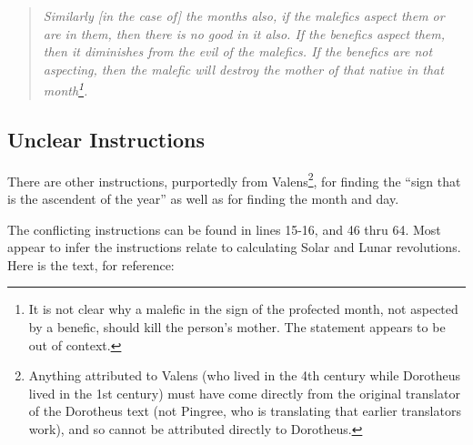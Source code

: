 \begin{quote}
\textsl{Similarly [in the case of] the months also, if the malefics aspect them or are in them, then there is no good in it also. If the benefics aspect them, then it diminishes from the evil of the malefics. If the benefics are not aspecting, then the malefic will destroy the mother of that native in that month\footnote{It is not clear why a malefic in the sign of the profected month, not aspected by a benefic, should kill the person's mother. The statement appears to be out of context.}.}
\end{quote}

\subsection{Unclear Instructions}
There are other instructions, purportedly from Valens\footnote{Anything attributed to Valens (who lived in the 4th century while Dorotheus lived in the 1st century) must have come directly from the original translator of the Dorotheus text (not Pingree, who is translating that earlier translators work), and so cannot be attributed directly to Dorotheus.}, for finding  the ``sign that is the ascendent of the year'' as well as for finding the month and day.

The conflicting instructions can be found in lines 15-16, and 46 thru 64. Most appear to infer the instructions relate to calculating Solar and Lunar revolutions. Here is the text, for reference:

